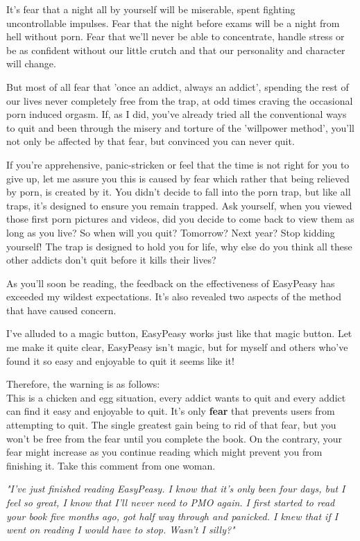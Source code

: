 \documentclass[easypeasy.tex]{subfiles}
\begin{document}
It's fear that a night all by yourself will be miserable, spent fighting uncontrollable impulses. Fear that the night before exams will be a night from hell without porn. Fear that we'll never be able to concentrate, handle stress or be as confident without our little crutch and that our personality and character will change.

But most of all fear that 'once an addict, always an addict', spending the rest of our lives never completely free from the trap, at odd times craving the occasional porn induced orgasm. If, as I did, you've already tried all the conventional ways to quit and been through the misery and torture of the 'willpower method', you'll not only be affected by that fear, but convinced you can never quit.

If you're apprehensive, panic-stricken or feel that the time is not right for you to give up, let me assure you this is caused by fear which rather that being relieved by porn, is created by it. You didn't decide to fall into the porn trap, but like all traps, it's designed to ensure you remain trapped. Ask yourself, when you viewed those first porn pictures and videos, did you decide to come back to view them as long as you live? So when will you quit? Tomorrow? Next year? Stop kidding yourself! The trap is designed to hold you for life, why else do you think all these other addicts don't quit before it kills their lives?

As you'll soon be reading, the feedback on the effectiveness of EasyPeasy has exceeded my wildest expectations. It's also revealed two aspects of the method that have caused concern. 

I've alluded to a magic button, EasyPeasy works just like that magic button. Let me make it quite clear, EasyPeasy isn't magic, but for myself and others who've found it so easy and enjoyable to quit it seems like it!

Therefore, the warning is as follows: \\
This is a chicken and egg situation, every addict wants to quit and every addict can find it easy and enjoyable to quit. It's only \textbf{fear} that prevents users from attempting to quit. The single greatest gain being to rid of that fear, but you won't be free from the fear until you complete the book. On the contrary, your fear might increase as you continue reading which might prevent you from finishing it. Take this comment from one woman.

\textit{\textit{"I've just finished reading EasyPeasy. I know that it's only been four days, but I feel so great, I know that I'll never need to PMO again. I first started to read your book five months ago, got half way through and panicked. I knew that if I went on reading I would have to stop. Wasn't I silly?"}}
\end{document}
